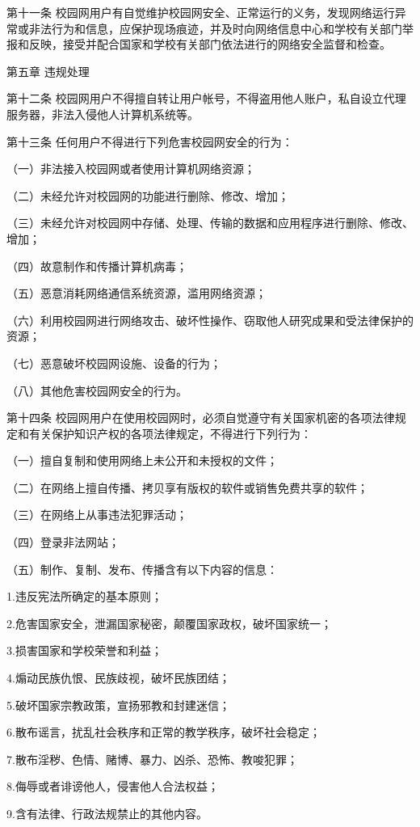 \documentclass[UTF8,12pt,a4paper]{report}
\begin{document}
第十一条 校园网用户有自觉维护校园网安全、正常运行的义务，发现网络运行异常或非法行为和信息，应保护现场痕迹，并及时向网络信息中心和学校有关部门举报和反映，接受并配合国家和学校有关部门依法进行的网络安全监督和检查。

第五章 违规处理

第十二条 校园网用户不得擅自转让用户帐号，不得盗用他人账户，私自设立代理服务器，非法入侵他人计算机系统等。

第十三条 任何用户不得进行下列危害校园网安全的行为：

（一）非法接入校园网或者使用计算机网络资源；

（二）未经允许对校园网的功能进行删除、修改、增加；

（三）未经允许对校园网中存储、处理、传输的数据和应用程序进行删除、修改、增加；

（四）故意制作和传播计算机病毒；

（五）恶意消耗网络通信系统资源，滥用网络资源；

（六）利用校园网进行网络攻击、破坏性操作、窃取他人研究成果和受法律保护的资源；

（七）恶意破坏校园网设施、设备的行为；

（八）其他危害校园网安全的行为。

第十四条 校园网用户在使用校园网时，必须自觉遵守有关国家机密的各项法律规定和有关保护知识产权的各项法律规定，不得进行下列行为：

（一）擅自复制和使用网络上未公开和未授权的文件；

（二）在网络上擅自传播、拷贝享有版权的软件或销售免费共享的软件；

（三）在网络上从事违法犯罪活动；

（四）登录非法网站；

（五）制作、复制、发布、传播含有以下内容的信息：

1.违反宪法所确定的基本原则；

2.危害国家安全，泄漏国家秘密，颠覆国家政权，破坏国家统一；

3.损害国家和学校荣誉和利益；

4.煽动民族仇恨、民族歧视，破坏民族团结；

5.破坏国家宗教政策，宣扬邪教和封建迷信；

6.散布谣言，扰乱社会秩序和正常的教学秩序，破坏社会稳定；

7.散布淫秽、色情、赌博、暴力、凶杀、恐怖、教唆犯罪；

8.侮辱或者诽谤他人，侵害他人合法权益；

9.含有法律、行政法规禁止的其他内容。
\end{document}
